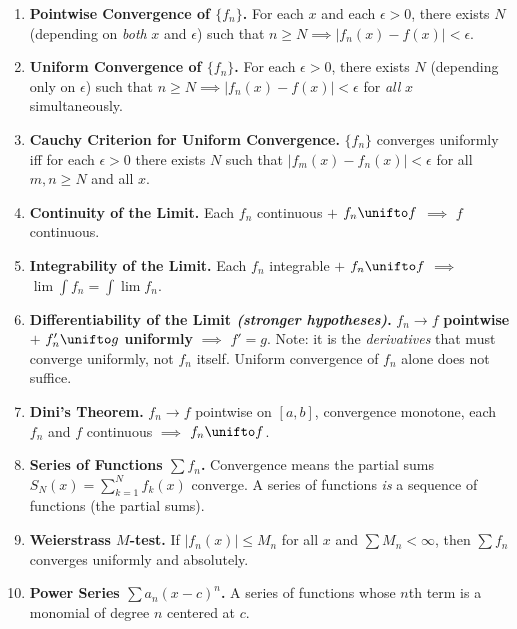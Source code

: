 \documentclass[worksheet]{workbook}
\begin{document}
\begin{enumerate}[label=\textbf{\Alph*.}, leftmargin=2.5em, itemsep=1pt]

\item \textbf{Pointwise Convergence of $\{f_n\}$.}  For each $x$ and each $\epsilon > 0$, there exists $N$ (depending on \emph{both} $x$ and $\epsilon$) such that $n \geq N \implies |f_n(x) - f(x)| < \epsilon$.

\item \textbf{Uniform Convergence of $\{f_n\}$.}  For each $\epsilon > 0$, there exists $N$ (depending only on $\epsilon$) such that $n \geq N \implies |f_n(x) - f(x)| < \epsilon$ for \emph{all} $x$ simultaneously.

\item \textbf{Cauchy Criterion for Uniform Convergence.}  $\{f_n\}$ converges uniformly iff for each $\epsilon > 0$ there exists $N$ such that $|f_m(x) - f_n(x)| < \epsilon$ for all $m, n \geq N$ and all $x$.

\item \textbf{Continuity of the Limit.}  Each $f_n$ continuous $+$ $f_n \unifto f$ $\implies$ $f$ continuous.

\item \textbf{Integrability of the Limit.}  Each $f_n$ integrable $+$ $f_n \unifto f$ $\implies$ $\lim \int f_n = \int \lim f_n$.

\item \textbf{Differentiability of the Limit \emph{(stronger hypotheses)}.}  $f_n \to f$ \textbf{pointwise} $+$ $f_n' \unifto g$ \textbf{uniformly} $\implies$ $f' = g$.  Note: it is the \emph{derivatives} that must converge uniformly, not $f_n$ itself.  Uniform convergence of $f_n$ alone does not suffice.

\item \textbf{Dini's Theorem.}  $f_n \to f$ pointwise on $[a,b]$, convergence monotone, each $f_n$ and $f$ continuous $\implies$ $f_n \unifto f$.

\item \textbf{Series of Functions $\sum f_n$.}  Convergence means the partial sums $S_N(x) = \sum_{k=1}^N f_k(x)$ converge.  A series of functions \emph{is} a sequence of functions (the partial sums).

\item \textbf{Weierstrass $M$-test.}  If $|f_n(x)| \leq M_n$ for all $x$ and $\sum M_n < \infty$, then $\sum f_n$ converges uniformly and absolutely.

\item \textbf{Power Series $\sum a_n(x-c)^n$.}  A series of functions whose $n$th term is a monomial of degree $n$ centered at $c$.


\end{enumerate}
\end{document}
